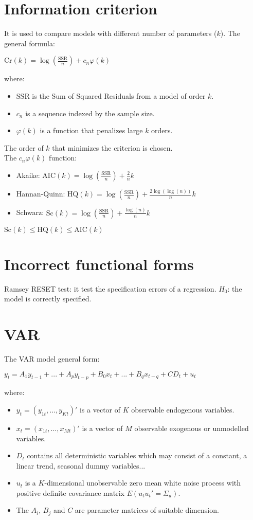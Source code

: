 \documentclass[10pt, a4paper, landscape]{extarticle}
\newcommand{\SSR}{\mathrm{SSR}}
\newcommand{\Cr}{\mathrm{Cr}}
\newcommand{\AIC}{\mathrm{AIC}}
\newcommand{\HQ}{\mathrm{HQ}}
\newcommand{\Sc}{\mathrm{Sc}}
\begin{document}
\begin{multicols}{3}
\section*{Information criterion}
	It is used to compare models with different number of parameters ($k$). The general formula:
	\begin{center}
		$\Cr(k) = \log(\frac{\SSR}{n}) + c_n \varphi (k)$
	\end{center}
	where:
	\begin{itemize}[leftmargin=*]
		\item $\SSR$ is the Sum of Squared Residuals from a model of order $k$.
		\item $c_n$ is a sequence indexed by the sample size.
		\item $\varphi(k)$ is a function that penalizes large $k$ orders.
	\end{itemize}
	The order of $k$ that minimizes the criterion is chosen. \\
	The $c_n \varphi(k)$ function:
	\begin{itemize}[leftmargin=*]
		\item Akaike: $\AIC(k) = \log(\frac{\SSR}{n}) + \frac{2}{n} k$
		\item Hannan-Quinn: $\HQ(k) = \log(\frac{\SSR}{n}) + \frac{2 \log(\log(n))}{n} k$
		\item Schwarz: $\Sc(k) = \log(\frac{\SSR}{n}) + \frac{\log(n)}{n} k$
	\end{itemize}
	$\Sc(k) \leq \HQ(k) \leq \AIC(k)$

\columnbreak


\section*{Incorrect functional forms}
	Ramsey RESET test: it test the specification errors of a regression. $H_0$: the model is correctly specified.

\section*{VAR}

The VAR model general form:

$y_t = A_1 y_{t-1} + ... + A_p y_{t-p} + B_0 x_t + ... + B_q x_{t-q} + CD_t + u_t$

where:

\begin{itemize}[leftmargin=*]
	\item $y_t = (y_{1t}, ..., y_{Kt})'$ is a vector of $K$ observable endogenous variables.
	\item $x_t = (x_{1t}, ..., x_{Mt})'$ is a vector of $M$ observable exogenous or unmodelled variables.
	\item $D_t$ contains all deterministic variables which may consist of a constant, a linear trend, seasonal dummy variables...
	\item $u_t$ is a $K$-dimensional unobservable zero mean white noise process with positive definite covariance matrix $E(u_t u_t' = \Sigma_u)$.
	\item The $A_i$, $B_j$ and $C$ are parameter matrices of suitable dimension.
\end{itemize}


\end{multicols}
\end{document}
